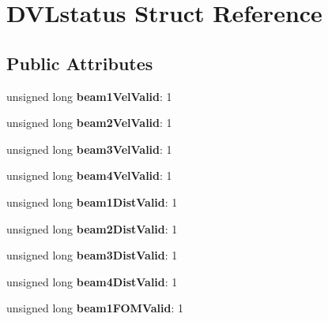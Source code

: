 \hypertarget{structDVLstatus}{}\section{D\+V\+Lstatus Struct Reference}
\label{structDVLstatus}
\subsection*{Public Attributes}
\begin{DoxyCompactItemize}
\item 
\mbox{\label{structDVLstatus_a405f7663cad8090b27f9e215c7db6fe9}} 
unsigned long {\bfseries beam1\+Vel\+Valid}\+: 1
\item 
\mbox{\label{structDVLstatus_a53978a4d789e5c1c65139d05b2e1263c}} 
unsigned long {\bfseries beam2\+Vel\+Valid}\+: 1
\item 
\mbox{\label{structDVLstatus_a495d0e27c2f604b3f8952a3198cab411}} 
unsigned long {\bfseries beam3\+Vel\+Valid}\+: 1
\item 
\mbox{\label{structDVLstatus_a85a7800693b0147eee214658d0c8c510}} 
unsigned long {\bfseries beam4\+Vel\+Valid}\+: 1
\item 
\mbox{\label{structDVLstatus_af046590caa5844f63acc79fd0871526d}} 
unsigned long {\bfseries beam1\+Dist\+Valid}\+: 1
\item 
\mbox{\label{structDVLstatus_ad7b1de7455cd6c44cf3d2d14f2f05951}} 
unsigned long {\bfseries beam2\+Dist\+Valid}\+: 1
\item 
\mbox{\label{structDVLstatus_aab61f47a41140ce1469eea7daaa5d4b2}} 
unsigned long {\bfseries beam3\+Dist\+Valid}\+: 1
\item 
\mbox{\label{structDVLstatus_a367e8d056ba9c2aadf924621bfc6d040}} 
unsigned long {\bfseries beam4\+Dist\+Valid}\+: 1
\item 
\mbox{\label{structDVLstatus_ad1c234d1bad1c320a8ba6681dd865f9b}} 
unsigned long {\bfseries beam1\+F\+O\+M\+Valid}\+: 1
\item 

\end{DoxyCompactItemize}
